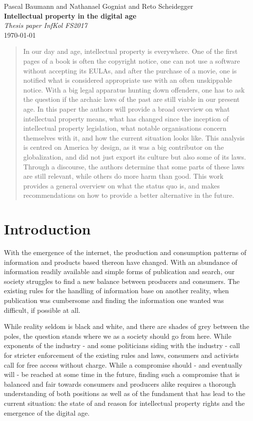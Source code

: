 \documentclass[a4paper]{report}
\newcommand*{\titleAP}{\begingroup %
	\centering
	\vspace*{\baselineskip} %
	
	{\Large Pascal Baumann} and {\Large Nathanael Gogniat} and {\Large Reto Scheidegger}\\[0.167\textheight] %
	
	{\Huge\bfseries Intellectual property in the digital age}\\[\baselineskip]
	
	{\Large \textit{Thesis paper InfKol FS2017}}\\
	\today
	
	\vspace*{3\baselineskip} %
	\endgroup}
\begin{document}
\titleAP

\begin{abstract}
	In our day and age, intellectual property is everywhere. One of the first pages of a book is often the copyright notice, one can not use a software without accepting its EULAs, and after the purchase of a movie, one is notified what is considered appropriate use with an often unskippable notice. With a big legal apparatus hunting down offenders, one has to ask the question if the archaic laws of the past are still viable in our present age. In this paper the authors will provide a broad overview on what intellectual property means, what has changed since the inception of intellectual property legislation, what notable organisations concern themselves with it, and how the current situation looks like. This analysis is centred on America by design, as it was a big contributor on the globalization, and did not just export its culture but also some of its laws. 
	Through a discourse, the authors determine that some parts of these laws are still relevant, while others do more harm than good. This work provides a general overview on what the status quo is, and makes recommendations on how to provide a better alternative in the future.
	
\end{abstract}
\newpage

\tableofcontents

\newpage

\chapter{Introduction}
\label{ch:Intro}
With the emergence of the internet, the production and consumption patterns of information and products based thereon have changed. With an abundance of information readily available and simple forms of publication and search, our society struggles to find a new balance between producers and consumers. The existing rules for the handling of information base on another reality, when publication was cumbersome and finding the information one wanted was difficult, if possible at all. 

While reality seldom is black and white, and there are shades of grey between the poles, the question stands where we as a society should go from here. While exponents of the industry - and some politicians siding with the industry - call for stricter enforcement of the existing rules and laws, consumers and activists call for free access without charge. While a compromise should - and eventually will - be reached at some time in the future, finding such a compromise that is balanced and fair towards consumers and producers alike requires a thorough understanding of both positions as well as of the fundament that has lead to the current situation: the state of and reason for intellectual property rights and the emergence of the digital age.
\end{document}
